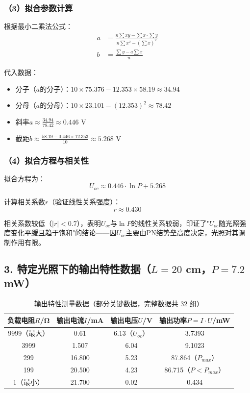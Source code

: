 \documentclass[12pt]{article}
\begin{document}
\subsubsection{（3）拟合参数计算}
根据最小二乘法公式：
\begin{align}
a &= \frac{n\sum xy - \sum x \cdot \sum y}{n\sum x^2 - (\sum x)^2} \\
b &= \frac{\sum y - a\sum x}{n}
\end{align}

代入数据：
\begin{itemize}
  \item 分子（$a$的分子）：$10 \times 75.376 - 12.353 \times 58.19 \approx 34.94$
  \item 分母（$a$的分母）：$10 \times 23.101 - (12.353)^2 \approx 78.42$
  \item 斜率$a \approx \frac{34.94}{78.42} \approx 0.446$ V
  \item 截距$b \approx \frac{58.19 - 0.446 \times 12.353}{10} \approx 5.268$ V
\end{itemize}

\subsubsection{（4）拟合方程与相关性}
拟合方程为：
$$U_{oc} \approx 0.446 \cdot \ln P + 5.268$$

计算相关系数$r$（验证线性关系强度）：
$$r \approx 0.430$$

相关系数较低（$|r| < 0.7$），表明$U_{oc}$与$\ln P$的线性关系较弱，印证了"$U_{oc}$随光照强度变化平缓且趋于饱和"的结论——因$U_{oc}$主要由PN结势垒高度决定，光照对其调制作用有限。

\subsection{3. 特定光照下的输出特性数据（$L=20$ cm，$P=7.2$ mW）}

\begin{table}[h]
\centering
\caption{输出特性测量数据（部分关键数据，完整数据共 32 组）}
\begin{tabular}{|c|c|c|c|}
\hline
负载电阻$R$/Ω & 输出电流$I$/mA & 输出电压$U$/V & 输出功率$P=I \cdot U$/mW \\
\hline
9999（最大） & 0.61 & 6.13（$U_{oc}$） & 3.7393 \\
3999 & 1.507 & 6.04 & 9.1023 \\
299 & 16.800 & 5.23 & 87.864（$P_{max}$） \\
199 & 20.500 & 4.23 & 86.715（$P < P_{max}$） \\
1（最小） & 21.700 & 0.02 & 0.434 \\
\hline
\end{tabular}
\end{table}
\end{document}
